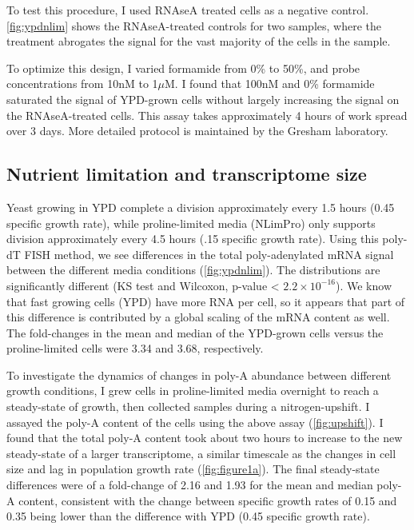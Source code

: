 To test this procedure, I used RNAseA treated cells as a negative
control.
\autoref{fig:ypdnlim} shows the RNAseA-treated controls for two
samples, where the treatment abrogates the signal for the vast
majority of the cells in the sample.

To optimize this design, I varied formamide from 0\% to 50\%, and
probe concentrations from 10nM to 1$\mu$M. I found that 100nM and 0\%
formamide saturated the signal of YPD-grown cells without largely
increasing the signal on the RNAseA-treated cells.
This assay takes approximately 4 hours of work spread over 3 days.
More detailed protocol is maintained by the Gresham laboratory.


%
%
%
\subsection{Nutrient limitation and transcriptome size}
%
%
%

Yeast growing in
YPD complete a division approximately every 1.5 hours (0.45 specific
growth rate), while 
proline-limited media (NLimPro) only supports division approximately
every 4.5 hours (.15 specific growth rate). 
Using this poly-dT FISH method, we see differences in the total 
poly-adenylated mRNA signal between the different media conditions
(\autoref{fig:ypdnlim}).
The distributions are significantly
different (KS test and Wilcoxon, p-value < $2.2 \times 10^{-16}$).
We know that fast growing cells (YPD) have more RNA per cell, so it
appears that part of this difference is contributed by a global
scaling of the mRNA content as well.
The fold-changes in the mean and median of the YPD-grown cells versus
the proline-limited cells were 3.34 and 3.68, respectively.


To investigate the dynamics of changes in poly-A abundance between 
different growth conditions, I grew cells in proline-limited media
overnight to reach a steady-state of growth, then collected samples
during a nitrogen-upshift.
I assayed the poly-A content of the cells using the above assay
(\autoref{fig:upshift}).
I found that the total poly-A content took about two hours to increase
to the new steady-state of a larger transcriptome, a similar timescale
as the changes in cell size and lag in population growth rate
(\autoref{fig:figure1a}).
The final steady-state differences were of a fold-change of 2.16 and
1.93 for the mean and median poly-A content, consistent with the
change between specific growth rates of 0.15 and 0.35 being lower
than the difference with YPD (0.45 specific growth rate). 

